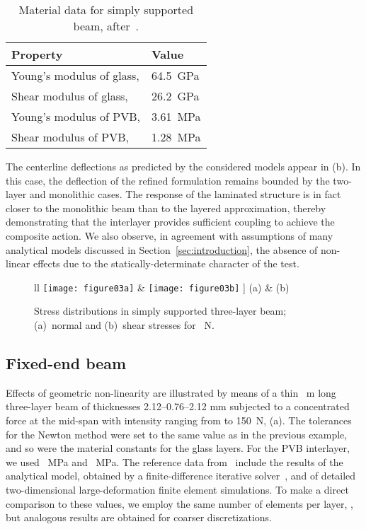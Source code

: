\documentclass[11pt]{article}
\newcommand{\rev}[1]{#1}
\newcommand{\Sref}[1]{Section~\ref{#1}}
\begin{document}
\begin{table}[h]
\caption{Material data for simply supported beam,
after~\cite{Asik:2005:MMB}.}
\label{tab:simply_supported_data}
\centering
\begin{tabular}{ll}
\hline
Property & Value \\
\hline
Young's modulus of glass,  & 64.5~GPa \\
Shear modulus of glass,  & 26.2~GPa \\
Young's modulus of PVB,  & 3.61~MPa \\
Shear modulus of PVB,  & 1.28~MPa \\  
\hline
\end{tabular}
\end{table}

The centerline deflections as predicted by the considered models appear in
(b). In this case, the deflection of the refined
formulation remains bounded by the two-layer and monolithic cases. The
response of the laminated structure is in fact closer to the monolithic beam than to the
layered approximation, thereby demonstrating that the interlayer
provides sufficient coupling to achieve the composite action. We also observe,
in agreement with assumptions of many analytical models discussed in
\Sref{sec:introduction}, the absence of non-linear effects due to
the statically-determinate character of the test.

\begin{figure}[h]
\begin{tabular}{ll}
\texttt{[image: figure03a]} & 
\texttt{[image: figure03b]} 
\-2mm]
(a) & (b)
\end{tabular}
\caption{\rev{Stress distributions in simply supported three-layer beam;
(a)~normal and (b)~shear stresses for ~N.}}
\label{fig:stress_distrib_simple}
\end{figure}

\subsection{Fixed-end beam}\label{sec:fixed_end}

Effects of geometric non-linearity are illustrated by means of a thin ~m
long three-layer beam of thicknesses 2.12--0.76--2.12 mm subjected to a
concentrated force at the mid-span with intensity ranging from  to 150~N,
\rev{}(a). The tolerances for the Newton method were set to
the same value as in the previous example, and so were the material constants for
the glass layers. For the PVB interlayer, we used ~MPa and ~MPa. The reference data from~\cite{Asik:2005:MMB}
include the results of the analytical model, obtained by a finite-difference iterative
solver~\cite{Asik:2003:LGP}, and of detailed two-dimensional large-deformation
finite element simulations. To make a direct comparison to these values, we
employ the same number of elements per layer, , but analogous
results are obtained for coarser discretizations.
\end{document}
